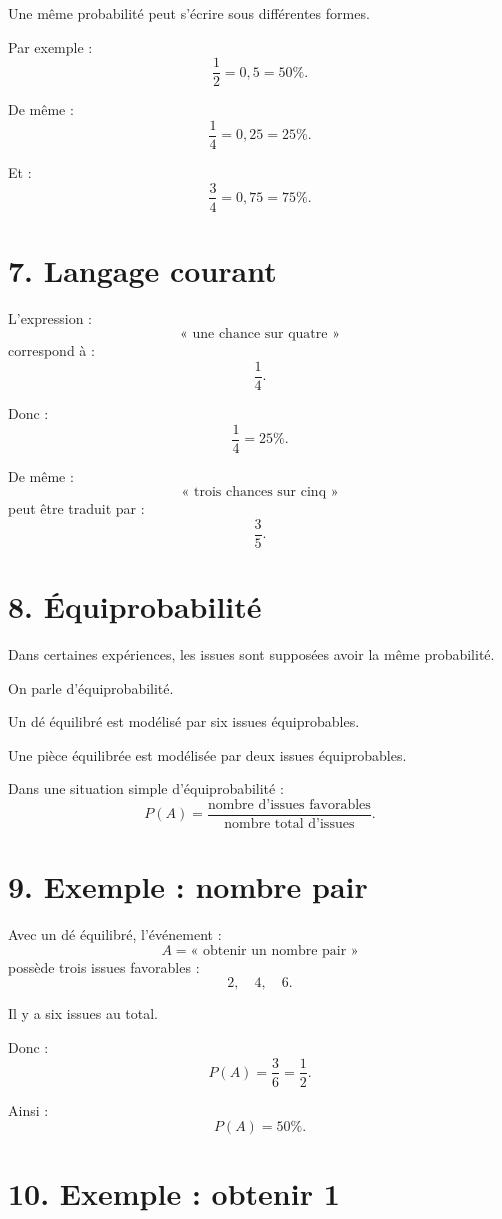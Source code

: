 Une même probabilité peut s'écrire sous différentes formes.

Par exemple :
\[
\dfrac12=0{,}5=50\%.
\]

De même :
\[
\dfrac14=0{,}25=25\%.
\]

Et :
\[
\dfrac34=0{,}75=75\%.
\]

\section{7. Langage courant}

L'expression :
\[
\text{« une chance sur quatre »}
\]
correspond à :
\[
\dfrac14.
\]

Donc :
\[
\dfrac14=25\%.
\]

De même :
\[
\text{« trois chances sur cinq »}
\]
peut être traduit par :
\[
\dfrac35.
\]

\section{8. Équiprobabilité}

Dans certaines expériences, les issues sont supposées avoir la même probabilité.

On parle d'équiprobabilité.

Un dé équilibré est modélisé par six issues équiprobables.

Une pièce équilibrée est modélisée par deux issues équiprobables.

\begin{propriete}
Dans une situation simple d'équiprobabilité :
\[
\boxed{
P(A)=
\dfrac{\text{nombre d'issues favorables}}{\text{nombre total d'issues}}
}.
\]
\end{propriete}

\section{9. Exemple : nombre pair}

Avec un dé équilibré, l'événement :
\[
A=\text{« obtenir un nombre pair »}
\]
possède trois issues favorables :
\[
2,\quad4,\quad6.
\]

Il y a six issues au total.

Donc :
\[
P(A)=\dfrac36=\dfrac12.
\]

Ainsi :
\[
\boxed{P(A)=50\%}.
\]

\section{10. Exemple : obtenir 1}

